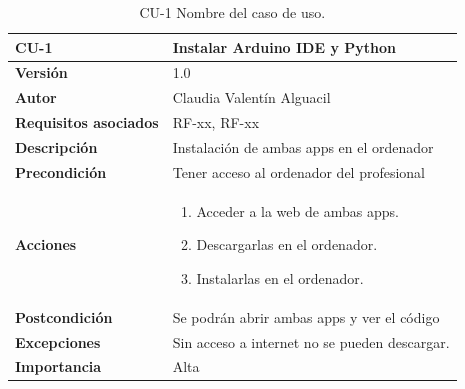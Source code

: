 \begin{table}[p]
	\centering
	\begin{tabularx}{\linewidth}{ p{} p{} }
		\toprule
		\textbf{CU-1}    & \textbf{Instalar Arduino IDE y Python}\\
		\toprule
		\textbf{Versión}              & 1.0    \\
		\textbf{Autor}                & Claudia Valentín Alguacil \\
		\textbf{Requisitos asociados} & RF-xx, RF-xx \\
		\textbf{Descripción}          & Instalación de ambas apps en el ordenador \\
		\textbf{Precondición}         & Tener acceso al ordenador del profesional \\
		\textbf{Acciones}             &
		\begin{enumerate}
			\def\labelenumi{\arabic{enumi}.}
			\tightlist
			\item Acceder a la web de ambas apps.
			\item Descargarlas en el ordenador.
                \item Instalarlas en el ordenador.
		\end{enumerate}\\
		\textbf{Postcondición}        &  Se podrán abrir ambas apps y ver el código \\
		\textbf{Excepciones}          & Sin acceso a internet no se pueden descargar. \\
		\textbf{Importancia}          & Alta \\
		\bottomrule
	\end{tabularx}
	\caption{CU-1 Nombre del caso de uso.}
\end{table}

